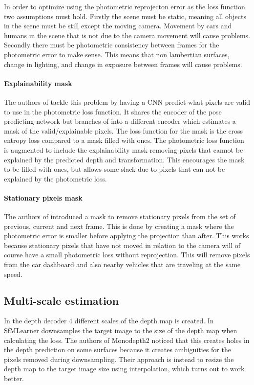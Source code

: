 In order to optimize using the photometric reprojecton error as the loss function two assumptions must hold. Firstly the scene must be static, meaning all objects in the scene must be still except the moving camera. Movement by cars and humans in the scene that is not due to the camera movement will cause problems. Secondly there must be photometric consistency between frames for the photometric error to make sense. This means that non lambertian surfaces, change in lighting, and change in exposure between frames will cause problems.

\paragraph{Explainability mask} The authors of \cite{sfmlearner} tackle this problem by having a CNN predict what pixels are valid to use in the photometric loss function. It shares the encoder of the pose predicting network but branches of into a different encoder which estimates a mask of the valid/explainable pixels. The loss function for the mask is the cross entropy loss compared to a mask filled with ones. The photometric loss function is augmented to include the explainability mask removing pixels that cannot be explained by the predicted depth and transformation. This encourages the mask to be filled with ones, but allows some slack due to pixels that can not be explained by the photometric loss.

\paragraph{Stationary pixels mask} The authors of \cite{monodepth2} introduced a mask to remove stationary pixels from the set of previous, current and next frame. This is done by creating a mask where the photometric error is smaller before applying the projection than after. This works because stationary pixels that have not moved in relation to the camera will of course have a small photometric loss without reprojection. This will remove pixels from the car dashboard and also nearby vehicles that are traveling at the same speed.

\subsection{Multi-scale estimation}

In the depth decoder 4 different scales of the depth map is created. In SfMLearner downsamples the target image to the size of the depth map when calculating the loss. The authors of Monodepth2 noticed that this creates holes in the depth prediction on some surfaces because it creates ambiguities for the pixels removed during downsampling. Their approach is instead to resize the depth map to the target image size using interpolation, which turns out to work better.

\fi